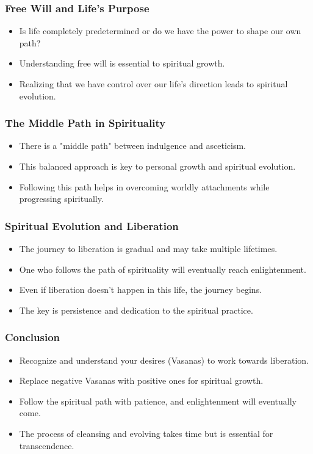 \begin{frame}\frametitle{Free Will and Life's Purpose}
  \begin{itemize}
    \item Is life completely predetermined or do we have the power to shape our own path?
    \item Understanding free will is essential to spiritual growth.
    \item Realizing that we have control over our life’s direction leads to spiritual evolution.
  \end{itemize}
\end{frame}

\begin{frame}\frametitle{The Middle Path in Spirituality}
  \begin{itemize}
    \item There is a "middle path" between indulgence and asceticism.
    \item This balanced approach is key to personal growth and spiritual evolution.
    \item Following this path helps in overcoming worldly attachments while progressing spiritually.
  \end{itemize}
\end{frame}

\begin{frame}\frametitle{Spiritual Evolution and Liberation}
  \begin{itemize}
    \item The journey to liberation is gradual and may take multiple lifetimes.
    \item One who follows the path of spirituality will eventually reach enlightenment.
    \item Even if liberation doesn’t happen in this life, the journey begins.
    \item The key is persistence and dedication to the spiritual practice.
  \end{itemize}
\end{frame}

\begin{frame}\frametitle{Conclusion}
  \begin{itemize}
    \item Recognize and understand your desires (Vasanas) to work towards liberation.
    \item Replace negative Vasanas with positive ones for spiritual growth.
    \item Follow the spiritual path with patience, and enlightenment will eventually come.
    \item The process of cleansing and evolving takes time but is essential for transcendence.
  \end{itemize}
\end{frame}
